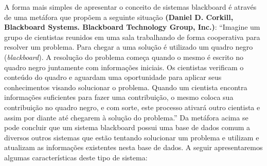 	A forma mais simples de apresentar o conceito de sistemas blackboard é através de uma metáfora que propõem a seguinte situação \textbf{(Daniel D. Corkill, Blackboard Systems. Blackboard Technology Group, Inc.)}:
 “Imagine um grupo de cientistas reunidos em uma sala trabalhando de forma cooperativa para resolver um problema. Para chegar a uma solução é utilizado um quadro negro (\textit{blackboard}).
A resolução do problema começa quando o mesmo é escrito no quadro negro juntamente com informações iniciais. Os cientistas verificam o conteúdo do quadro e aguardam uma oportunidade para aplicar seus conhecimentos visando solucionar o problema. Quando um cientista encontra informações suficientes para fazer uma contribuição, o mesmo coloca sua contribuição no quadro negro, e com sorte, este processo ativará outro cientista e assim por diante até chegarem à solução do problema.”
	Da metáfora acima se pode concluir que um sistema blackboard possui uma base de dados comum a diversos outros sistemas que estão tentando solucionar um problema e utilizam e atualizam as informações existentes nesta base de dados.
	 A seguir apresentaremos algumas características deste tipo de sistema:
